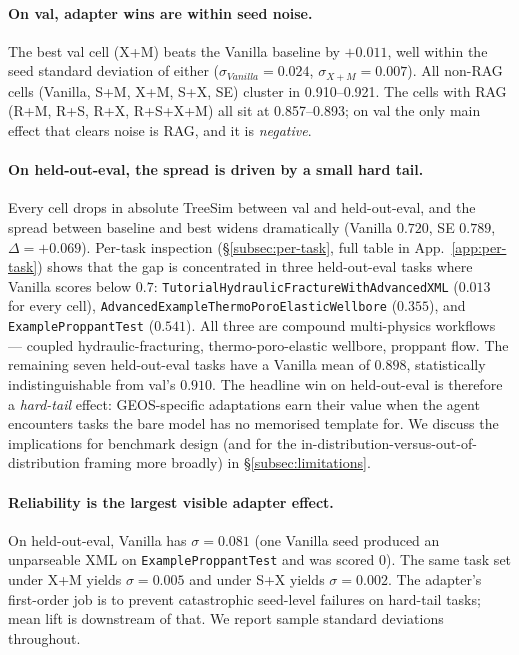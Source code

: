\documentclass{article}
\begin{document}
\paragraph{On val, adapter wins are within seed noise.} The best val cell (X+M) beats the Vanilla baseline by $+0.011$, well within the seed standard deviation of either ($\sigma_{Vanilla}=0.024$, $\sigma_{X+M}=0.007$). All non-RAG cells (Vanilla, S+M, X+M, S+X, SE) cluster in 0.910--0.921. The cells with RAG (R+M, R+S, R+X, R+S+X+M) all sit at 0.857--0.893; on val the only main effect that clears noise is RAG, and it is \emph{negative}.

\paragraph{On held-out-eval, the spread is driven by a small hard tail.} Every cell drops in absolute TreeSim between val and held-out-eval, and the spread between baseline and best widens dramatically (Vanilla $0.720$, SE $0.789$, $\Delta = +0.069$). Per-task inspection (\S\ref{subsec:per-task}, full table in App.~\ref{app:per-task}) shows that the gap is concentrated in three held-out-eval tasks where Vanilla scores below $0.7$: \texttt{TutorialHydraulicFractureWithAdvancedXML} ($0.013$ for every cell), \texttt{AdvancedExampleThermoPoroElasticWellbore} ($0.355$), and \texttt{ExampleProppantTest} ($0.541$). All three are compound multi-physics workflows --- coupled hydraulic-fracturing, thermo-poro-elastic wellbore, proppant flow. The remaining seven held-out-eval tasks have a Vanilla mean of $0.898$, statistically indistinguishable from val's $0.910$. The headline win on held-out-eval is therefore a \emph{hard-tail} effect: GEOS-specific adaptations earn their value when the agent encounters tasks the bare model has no memorised template for. We discuss the implications for benchmark design (and for the in-distribution-versus-out-of-distribution framing more broadly) in \S\ref{subsec:limitations}.

\paragraph{Reliability is the largest visible adapter effect.} On held-out-eval, Vanilla has $\sigma=0.081$ (one Vanilla seed produced an unparseable XML on \texttt{ExampleProppantTest} and was scored 0). The same task set under X+M yields $\sigma=0.005$ and under S+X yields $\sigma=0.002$. The adapter's first-order job is to prevent catastrophic seed-level failures on hard-tail tasks; mean lift is downstream of that. We report sample standard deviations throughout.
\end{document}
